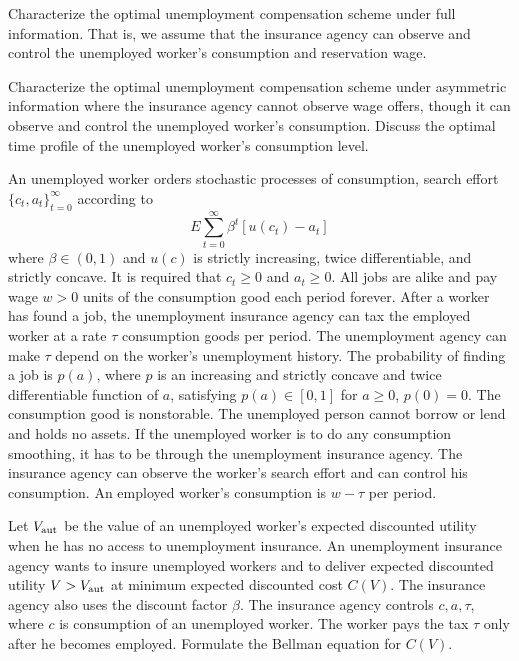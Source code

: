 \medskip
{}  Characterize the optimal unemployment compensation
scheme under full information. That is, we assume that the insurance
agency can observe and control the unemployed worker's consumption
and reservation wage.

\medskip
{}  Characterize the optimal unemployment compensation
scheme under asymmetric information where the insurance agency cannot
observe wage offers, though it can observe and control the unemployed
worker's consumption. Discuss the optimal time profile of the
unemployed worker's consumption level.

\medskip
{} 
\medskip
\noindent
An unemployed worker orders stochastic processes of
consumption, search effort $\{c_t , a_t\}_{t=0}^\infty$
according to
$$ E \sum_{t=0}^\infty \beta^t \left[ u(c_t) - a_t \right]  $$
where $\beta \in (0,1)$ and
$u(c)$ is strictly increasing, twice differentiable,
and strictly concave.  It is required
that $c_t \geq 0$ and $ a_t \geq 0$.
    All jobs are alike and pay wage
$w >0$ units of the consumption good each period forever. After
a worker has found a job, the unemployment insurance agency can
tax the employed worker at a rate $\tau$ consumption goods per period.
The unemployment agency can make $\tau$ depend on the worker's
unemployment history.
The probability
of finding a job  is $p(a)$, where $p$ is an increasing
and strictly concave and twice differentiable function of $a$, satisfying
$p(a)   \in [0,1]$ for  $a \geq 0$, $p(0)=0$.
The consumption good is nonstorable.
The unemployed person cannot borrow or lend and holds no assets.
If the unemployed worker is to do any consumption smoothing,
it has to be through the unemployment insurance agency.
The insurance agency can observe the worker's search effort and can control
his consumption.    An employed worker's consumption is $w -\tau$ per period.

\medskip
{}  Let $V_{\rm aut} $ be the value of an unemployed
 worker's expected discounted utility when he has no access to unemployment
insurance.  An unemployment insurance agency wants to insure unemployed
workers and to deliver expected discounted utility
$V > V_{\rm aut}$  at minimum expected discounted cost $C(V)$.
The insurance agency also uses the discount factor $\beta$.
The insurance agency controls $c,a,\tau$, where $c$ is consumption
of an unemployed worker.  The worker pays the tax
$\tau$ only after he becomes employed.
Formulate the Bellman equation for $C(V)$. %
\medskip
%
%


